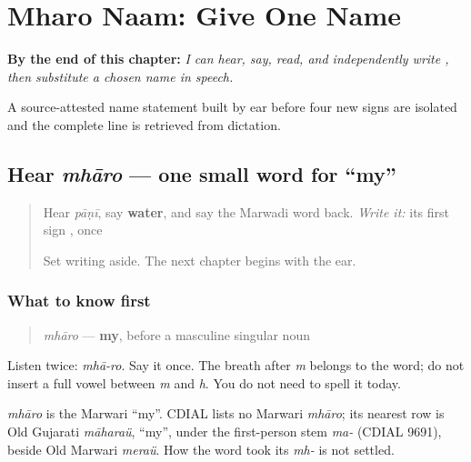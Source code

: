 
\chapter{Mharo Naam: Give One Name}
\label{ch:mw-name-answer}

\begin{chapteropening}
\textbf{By the end of this chapter:} \emph{I can hear, say, read, and independently write    , then substitute a chosen name in speech.}

A source-attested name statement built by ear before four new signs are isolated and the complete line is retrieved from dictation.
\end{chapteropening}

\section[mhāro]{Hear \emph{mhāro} — one small word for \textquotedblleft{}my\textquotedblright{}}

\label{lesson:MW-C05-hear-mharo}



\begin{quote}
Hear \emph{pāṇī}, say \textbf{water}, and say the Marwadi word back. \emph{Write it:} its first sign \textbf{}, once

Set writing aside. The next chapter begins with the ear.
\end{quote}

\subsection*{What to know first}
\begin{quote}
\emph{mhāro} — \textbf{my}, before a masculine singular noun
\end{quote}

Listen twice: \emph{mhā-ro}. Say it once. The breath after \emph{m} belongs to the word; do not insert a full vowel between \emph{m} and \emph{h}. You do not need to spell it today.

\begin{cousinweb}
\emph{mhāro} is the Marwari \textquotedblleft{}my\textquotedblright{}. CDIAL lists no Marwari \emph{mhāro}; its nearest row is Old Gujarati \emph{māharaü}, \textquotedblleft{}my\textquotedblright{}, under the first-person stem \emph{ma-} (CDIAL 9691), beside Old Marwari \emph{meraü}. How the word took its \emph{mh-} is not settled.
\end{cousinweb}

